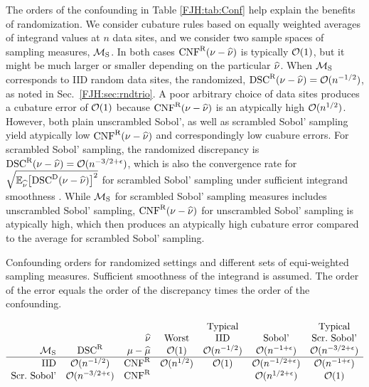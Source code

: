 \documentclass[graybox,footinfo]{svmult}
\DeclareMathOperator{\algn}{CNF}
\DeclareMathOperator{\disc}{DSC}
\begin{document}
The orders of the confounding in Table \ref{FJH:tab:Conf} help explain the 
benefits of randomization.  We consider cubature rules based on equally weighted 
averages of integrand values at $n$ data sites, and we consider two sample spaces of 
sampling measures, ${\mathcal{M}}_{\textup{S}}$.  In both cases $\algn^\Rn(\nu - \hnu)$ is 
typically ${\mathcal{O}}(1)$, but it might be much larger or smaller depending on the particular 
$\widehat{\nu}$.  When ${\mathcal{M}}_{\textup{S}}$ corresponds to IID random data sites, the 
randomized, $\disc^\Rn(\nu - \hnu) = \calO(n^{-1/2})$, as noted in Sec.\ 
\ref{FJH:sec:rndtrio}.  A poor 
arbitrary choice of data sites produces a cubature error of ${\mathcal{O}}(1)$ because 
$\algn^\Rn(\nu - \hnu)$ is an atypically high ${\mathcal{O}}(n^{1/2})$.  
However, both plain unscrambled Sobol', as well as scrambled Sobol' sampling yield 
atypically low $\algn^\Rn(\nu - \hnu)$ and correspondingly low cuabure errors.  For 
scrambled Sobol' sampling, the randomized discrepancy is $\disc^\Rn(\nu - \hnu) 
=\calO(n^{-3/2 + 
\epsilon})$, which is also the convergence rate for $\sqrt{\bbE_{\hnu}\bigl[\disc^\Dt(\nu - 
\hnu)\bigr ]^2}$ for scrambled 
Sobol' sampling under sufficient integrand smoothness \cite{HicHon98a, HicYue00}.
While ${\mathcal{M}}_{\textup{S}}$ for scrambled Sobol' sampling measures includes 
unscrambled 
Sobol' 
sampling, $\algn^\Rn(\nu - \hnu)$ for unscrambled Sobol' sampling is atypically high, 
which then produces an atypically high
cubature error compared to the average for scrambled Sobol' sampling.

\begin{table}
	\caption{Confounding orders for randomized settings and 
		different sets of equi-weighted 
		sampling measures. Sufficient smoothness of the integrand is assumed.
		The order of the error equals the order of the discrepancy times the 
		order of the confounding. \label{FJH:tab:Conf}}
	\begin{equation*}
	\begin{array}{r@{\quad }c@{\quad }r@{\quad}c@{\quad}c@{\quad}c@{\quad}c}
	&&&&\text{Typical} &&\text{Typical}\\
	\multicolumn{3}{r@{\quad}}{\hnu} &  \textup{Worst} &  \textup{IID} &
	\textup{Sobol'}&  \textup{Scr.\ Sobol'}\\
	\calM_{\textup{S}} & \disc^\Rn & \mu - \hmu & \calO(1) & \calO(n^{-1/2}) & 
	\calO(n^{-1+\epsilon}) & 
	\calO(n^{-3/2+\epsilon})\\
	\hline 
	\textup{IID} & \calO(n^{-1/2}) & \algn^\Rn & \calO(n^{1/2})  & \calO(1) 
	&\calO(n^{-1/2+\epsilon}) &\calO(n^{-1+\epsilon}) \\
	\textup{Scr.\ Sobol'} &\calO(n^{-3/2+\epsilon}) & \algn^\Rn 
	& & &\calO(n^{1/2+\epsilon})&\calO(1) 
	\end{array}
	\end{equation*}
\end{table}
\end{document}
